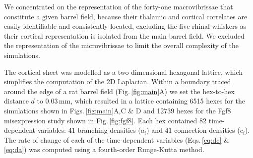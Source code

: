 \documentclass[9pt,lineno]{elife}
\newcommand{\MPone}[1]{\textcolor{colmpone}{#1}}
\begin{document}
\MPone{We concentrated on the representation of the forty-one macrovibrissae
  that constitute a given barrel field, because their thalamic and cortical
  correlates are easily identifiable and consistently located, excluding the
  five rhinal whiskers as their cortical representation is isolated from the
  main barrel field. We excluded the representation of the microvibrissae to
  limit the overall complexity of the simulations.}

The cortical sheet was modelled as a two dimensional hexagonal lattice, which
simplifies the computation of the 2D Laplacian. Within a boundary traced
around the edge of a rat barrel field (Fig.\,\ref{fig:main}A) we set the
hex-to-hex distance $d$ to 0.03\,mm, which resulted in a lattice containing
6515 hexes for the simulations shown in Figs.\,\ref{fig:main}A,C \& D and
12739 hexes for the Fgf8 misexpression study shown in
Fig.\,\ref{fig:fgf8}. Each hex contained 82 time-dependent variables: 41
branching densities ($a_i$) and 41 connection densities ($c_i$).  The rate of
change of each of the time-dependent variables (Eqs.\,\ref{eq:dc} \&
\ref{eq:da}) was computed using a fourth-order Runge-Kutta method.
\end{document}
